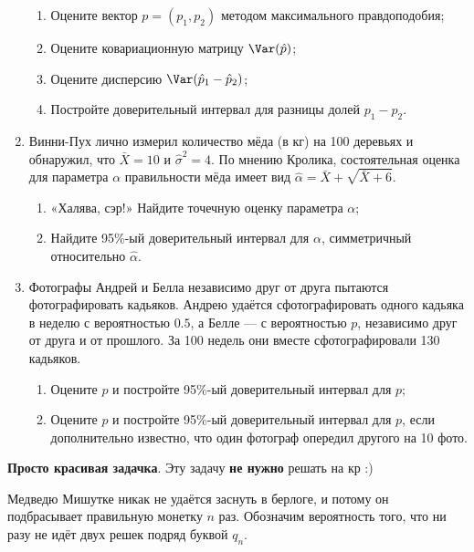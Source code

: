 \begin{enumerate}
      \begin{enumerate}
	\item Оцените вектор $p = (p_1, p_2)$ методом максимального правдоподобия;
	\item Оцените ковариационную матрицу $\Var(\hat p)$;
	\item Оцените дисперсию $\Var(\hat p_1 - \hat p_2)$;
	\item Постройте доверительный интервал для разницы долей $p_1 - p_2$.
      \end{enumerate}

  \item Винни-Пух лично измерил количество мёда (в кг) на 100 деревьях и обнаружил, что $\bar X = 10$ и $\hat\sigma^2 = 4$.
    По мнению Кролика, состоятельная оценка для параметра $\alpha$ правильности мёда имеет вид $\hat \alpha = \bar X + \sqrt{\bar X + 6}$.

    \begin{enumerate}
      \item «Халява, сэр!» Найдите точечную оценку параметра $\alpha$;
      \item Найдите 95\%-ый доверительный интервал для $\alpha$, симметричный относительно $\hat\alpha$.
    \end{enumerate}

  \item Фотографы Андрей и Белла независимо друг от друга пытаются фотографировать кадьяков.
    Андрею удаётся сфотографировать одного кадьяка в неделю с вероятностью $0.5$, а Белле — с вероятностью $p$,
    независимо друг от друга и от прошлого.
    За 100 недель они вместе сфотографировали 130 кадьяков.

    \begin{enumerate}
      \item Оцените $p$ и постройте 95\%-ый доверительный интервал для $p$;
      \item Оцените $p$ и постройте 95\%-ый доверительный интервал для $p$, если дополнительно известно, что один фотограф опередил другого на 10 фото.
    \end{enumerate}

\end{enumerate}


\textbf{Просто красивая задачка}. Эту задачу \textbf{не нужно} решать на кр :)

Медведю Мишутке никак не удаётся заснуть в берлоге, и потому он подбрасывает правильную монетку $n$ раз.
Обозначим вероятность того, что ни разу не идёт двух решек подряд буквой $q_n$.


